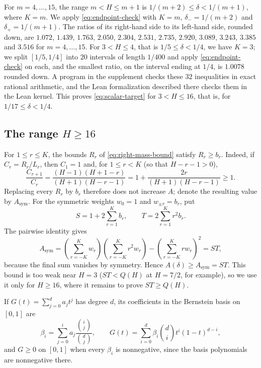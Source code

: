 \documentclass[ECP]{ejpecp}
\begin{document}
For $m=4,\ldots,15$, the range $m<H\leq m+1$ is $1/(m+2)\leq\delta<1/(m+1)$,
where $K=m$. We apply \eqref{eq:endpoint-check} with $K=m$,
$\delta_-=1/(m+2)$ and $\delta_+=1/(m+1)$. The ratios of its right-hand side
to its left-hand side, rounded down, are $1.072$, $1.439$, $1.763$, $2.050$,
$2.304$, $2.531$, $2.735$, $2.920$, $3.089$, $3.243$, $3.385$ and $3.516$ for
$m=4,\ldots,15$. For $3<H\leq4$, that is $1/5\leq\delta<1/4$, we have
$K=3$; we split $[1/5,1/4]$ into $20$ intervals of length $1/400$ and apply
\eqref{eq:endpoint-check} on each, and the smallest ratio, on the interval
ending at $1/4$, is $1.0078$ rounded down. A program in the supplement checks
these $32$ inequalities in exact rational arithmetic, and the Lean
formalization described there checks them in the Lean kernel. This proves
\eqref{eq:scalar-target} for $3<H\leq16$, that is, for $1/17\leq\delta<1/4$.

\subsection{The range \texorpdfstring{$H\geq16$}{H >= 16}}
\label{sec:large}

For $1\leq r\leq K$, the bounds $R_r$ of \eqref{eq:right-mass-bound} satisfy
$R_r\geq b_r$. Indeed, if $C_r=R_r/L_r$, then $C_1=1$ and, for $1\leq r<K$
(so that $H-r-1>0$),
\begin{equation}\label{eq:C-ratio}
  \frac{C_{r+1}}{C_r}
  =\frac{(H-1)(H+1-r)}{(H+1)(H-r-1)}
  =1+\frac{2r}{(H+1)(H-r-1)}\geq1.
\end{equation}
Replacing every $R_r$ by $b_r$ therefore does not increase $A$; denote the
resulting value by $A_{\mathrm{sym}}$. For the symmetric weights $w_0=1$ and
$w_{\pm r}=b_r$, put
\begin{equation}\label{eq:S-T}
  S=1+2\sum_{r=1}^K b_r,
  \qquad
  T=2\sum_{r=1}^K r^2b_r.
\end{equation}
The pairwise identity gives
\[
  A_{\mathrm{sym}}
  =\left(\sum_{r=-K}^K w_r\right)
   \left(\sum_{r=-K}^K r^2w_r\right)
   -\left(\sum_{r=-K}^K rw_r\right)^2
  =ST,
\]
because the final sum vanishes by symmetry. Hence
$A(\delta)\geq A_{\mathrm{sym}}=ST$. This bound is too weak near $H=3$
($ST<Q(H)$ at $H=7/2$, for example), so we use it only for $H\geq16$, where it
remains to prove $ST\geq Q(H)$.

If $G(t)=\sum_{j=0}^d a_jt^j$ has degree $d$, its coefficients in the
Bernstein basis on $[0,1]$ are
\begin{equation}\label{eq:bernstein-conversion}
  \beta_i=\sum_{j=0}^i a_j
  \frac{\binom{i}{j}}{\binom{d}{j}},
  \qquad
  G(t)=\sum_{i=0}^d \beta_i\binom di t^i(1-t)^{d-i},
\end{equation}
and $G\geq0$ on $[0,1]$ when every $\beta_i$ is nonnegative, since the basis
polynomials are nonnegative there.
\end{document}
